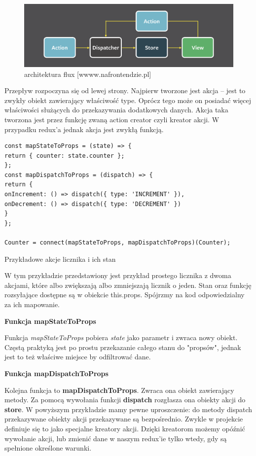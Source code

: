 \begin{figure}
	\centering\includegraphics[width=.6\textwidth]{img/flux}
	\caption{architektura flux [wwww.nafrontendzie.pl]}\label{rys:flux}%
\end{figure}

Przepływ rozpoczyna się od lewej strony. Najpierw tworzone jest akcja – jest to zwykły obiekt zawierający właściwość type. Oprócz tego może on posiadać więcej właściwości służących do przekazywania dodatkowych danych. Akcja taka tworzona jest przez funkcję zwaną action creator czyli kreator akcji. W przypadku redux'a jednak akcja jest zwykłą funkcją. 

\begin{listing}
\begin{verbatim}
const mapStateToProps = (state) => {
return { counter: state.counter };
};
const mapDispatchToProps = (dispatch) => {
return {
onIncrement: () => dispatch({ type: 'INCREMENT' }),
onDecrement: () => dispatch({ type: 'DECREMENT' })
}
};

Counter = connect(mapStateToProps, mapDispatchToProps)(Counter);
\end{verbatim}
\caption{Przykładowe akcje licznika i ich stan} \label{listing:moj}
\end{listing}

W tym przykładzie przedstawiony jest przykład prostego licznika z dwoma akcjami, które albo zwiększają albo zmniejszają licznik o jeden. Stan oraz funkcję rozsyłające dostępne są w obiekcie this.props. Spójrzmy na kod odpowiedzialny za ich mapowanie.
\begin{center}
	\textbf{Funkcja mapStateToProps}
\end{center}
Funkcja \textit{mapStateToProps} pobiera \textit{state} jako parametr i zwraca nowy obiekt. Częstą praktyką jest po prostu przekazanie całego stanu do "propsów", jednak jest to też właściwe miejsce by odfiltrować dane. 
\begin{center}
	\textbf{Funkcja mapDispatchToProps}
\end{center}
Kolejna funkcja to \textbf{mapDispatchToProps}. Zwraca ona obiekt zawierający metody. Za pomocą wywołania funkcji \textbf{dispatch} rozgłasza ona obiekty akcji do \textbf{store}. W powyższym przykładzie mamy pewne uproszczenie: do metody dispatch przekazywane obiekty akcji przekazywane są bezpośrednio. Zwykle w projekcie definiuje się to jako specjalne kreatory akcji. Dzięki kreatorom możemy opóźnić wywołanie akcji, lub zmienić dane w naszym redux'ie tylko wtedy, gdy są spełnione określone warunki.

